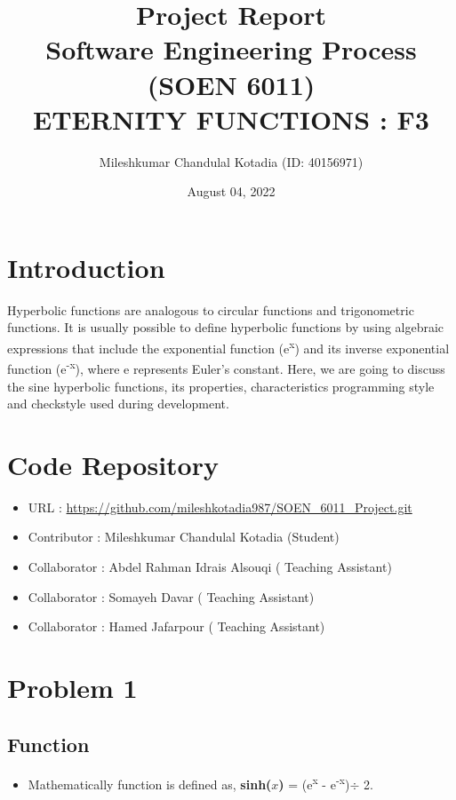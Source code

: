 \documentclass[
	12pt
]{article}
\title{Project  Report  \\ Software Engineering Process (SOEN 6011)\\ \vspace{20pt} ETERNITY FUNCTIONS : F3}
\author{Mileshkumar Chandulal Kotadia (ID: 40156971)\\}
\date{August 04, 2022}
\begin{document}
\maketitle
\newpage

\tableofcontents

\newpage
\section{Introduction}
Hyperbolic functions are analogous to circular functions and trigonometric functions. It is usually possible to define hyperbolic functions by using algebraic expressions that include the exponential function (e\textsuperscript{x}) and its inverse exponential function (e\textsuperscript{-x}), where e represents Euler's constant. Here, we are going to discuss the sine hyperbolic functions, its properties, characteristics programming style and checkstyle used during development.

\section{Code Repository}
\begin{itemize}
\item URL : \url{https://github.com/mileshkotadia987/SOEN_6011_Project.git}
    \item Contributor : Mileshkumar Chandulal Kotadia (Student)
    \item Collaborator :  Abdel Rahman Idrais Alsouqi ( Teaching Assistant)
    \item Collaborator :  Somayeh Davar ( Teaching Assistant)
    \item Collaborator :  Hamed Jafarpour ( Teaching Assistant)
\end{itemize}

\section{Problem 1}
\subsection{Function}
\begin{itemize}
    \item Mathematically function is defined as, \textbf{sinh($x$)} =   {(e\textsuperscript{x} - e\textsuperscript{-x})}{$\div$ 2}.
\end{itemize}
\end{document}

